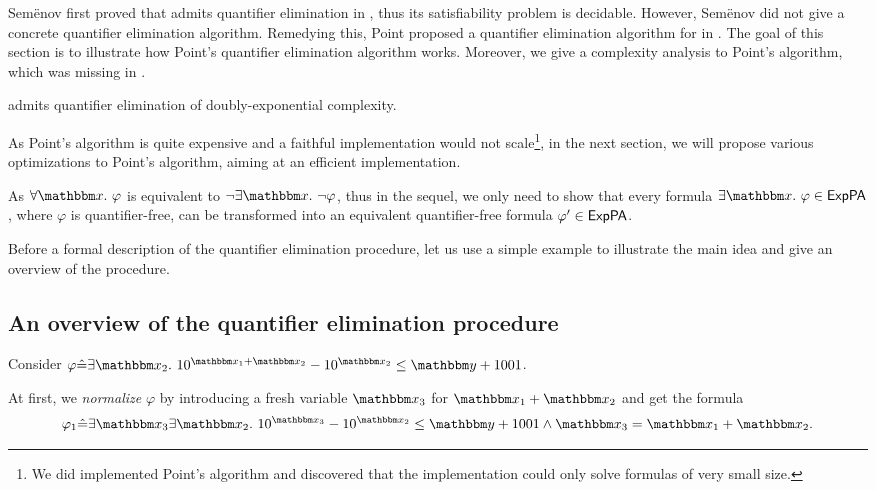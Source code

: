 
Sem\"{e}nov first proved that  {\paexp} admits quantifier elimination in \cite{Semenov84}, thus its satisfiability problem is decidable. However, Sem\"{e}nov did not give a concrete quantifier elimination algorithm. Remedying this, Point proposed a quantifier elimination algorithm for {\paexp} in \cite{Point86}. 
The goal of this section is to illustrate how Point's quantifier elimination algorithm works. Moreover, we give a complexity analysis to Point's algorithm, which was missing in \cite{Point86}.
%
\begin{theorem}\label{thm-paexp}
{\paexp} admits quantifier elimination of doubly-exponential complexity.
\end{theorem}
%
As Point's algorithm is quite expensive and a faithful implementation would not scale\footnote{We did implemented Point's algorithm and discovered that the implementation could only solve formulas of very small size.}, in the next section, we will propose various optimizations to Point's algorithm, aiming at an efficient implementation. 

As $\forall \ivarx. \ \varphi$ is equivalent to $\neg \exists \ivarx. \ \neg \varphi$,  thus in the sequel, we only need to  show that every {\paexp} formula $\exists \ivarx.\ \varphi \in \paexp$, where $\varphi$ is quantifier-free, can be transformed into an equivalent quantifier-free formula $\varphi' \in {\sf ExpPA}$.



Before a formal description of the quantifier elimination procedure, let us use a simple example to illustrate the main idea and give an overview of the procedure.

\subsection{An overview of the quantifier elimination procedure}
Consider $\varphi \Def \exists \ivarx_2.\ 10^{\ivarx_1 + \ivarx_2} - 10^{\ivarx_2} \le \ivary + 1001$. 

At first, we \emph{normalize} $\varphi$ by introducing a fresh variable $\ivarx_3$ for $\ivarx_1 + \ivarx_2$ and get the formula 
$$\varphi_1 \Def \exists \ivarx_3 \exists \ivarx_2.\ 10^{\ivarx_3} - 10^{\ivarx_2} \le \ivary + 1001 \wedge \ivarx_3 = \ivarx_1 + \ivarx_2.$$

